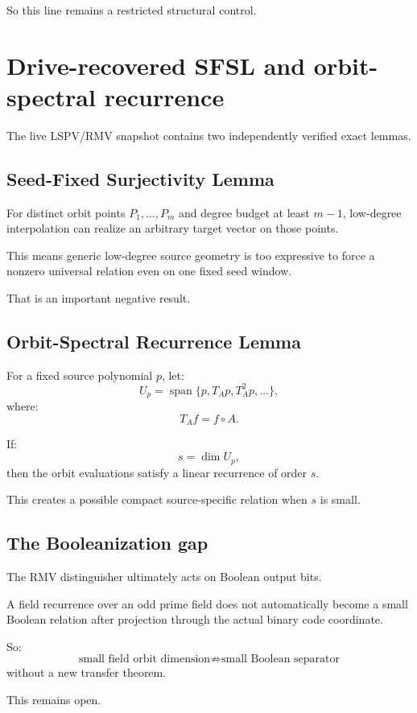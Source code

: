 \documentclass[11pt]{article}
\theoremstyle{plain}
\theoremstyle{definition}
\theoremstyle{remark}
\begin{document}
So this line remains a restricted structural control.

\section{Drive-recovered SFSL and orbit-spectral recurrence}

The live LSPV/RMV snapshot contains two independently verified exact lemmas.

\subsection{Seed-Fixed Surjectivity Lemma}

For distinct orbit points \(P_1,\ldots,P_m\) and degree budget at least
\(m-1\), low-degree interpolation can realize an arbitrary target vector on
those points.

This means generic low-degree source geometry is too expressive to force a
nonzero universal relation even on one fixed seed window.

That is an important negative result.

\subsection{Orbit-Spectral Recurrence Lemma}

For a fixed source polynomial \(p\), let:
\[
U_p
=
\operatorname{span}
\{p,T_Ap,T_A^2p,\ldots\},
\]
where:
\[
T_Af=f\circ A.
\]

If:
\[
s=\dim U_p,
\]
then the orbit evaluations satisfy a linear recurrence of order \(s\).

This creates a possible compact source-specific relation when \(s\) is small.

\subsection{The Booleanization gap}

The RMV distinguisher ultimately acts on Boolean output bits.

A field recurrence over an odd prime field does not automatically become a
small Boolean relation after projection through the actual binary code
coordinate.

So:
\[
\boxed{
\text{small field orbit dimension}
\not\Rightarrow
\text{small Boolean separator}
}
\]
without a new transfer theorem.

This remains open.
\end{document}
